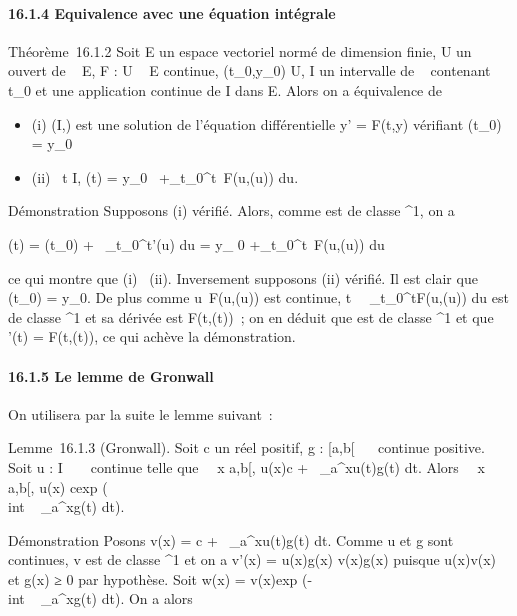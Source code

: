 \documentclass[]{article}
\begin{document}
\paragraph{16.1.4 Equivalence avec une équation intégrale}

Théorème~16.1.2 Soit E un espace vectoriel normé de dimension finie, U
un ouvert de ~ \times E, F : U \rightarrow~ E continue, (t_0,y_0) \in U,
I un intervalle de ~ contenant t_0 et \phi une application
continue de I dans E. Alors on a équivalence de

\begin{itemize}
\itemsep1pt\parskip0pt
\item
  (i) (I,\phi) est une solution de l'équation différentielle y' = F(t,y)
  vérifiant \phi(t_0) = y_0
\item
  (ii) \forall~t \in I, \phi(t) = y_0~
  +\int  _t_0^t~F(u,\phi(u))
  du.
\end{itemize}

Démonstration Supposons (i) vérifié. Alors, comme \phi est de classe
^1, on a

\phi(t) = \phi(t_0) +\int ~
_t_0^t\phi'(u) du = y_ 0
+\int  _t_0^t~F(u,\phi(u))
du

ce qui montre que (i) \rigtharrow~(ii). Inversement supposons (ii) vérifié. Il est
clair que \phi(t_0) = y_0. De plus comme
u\mapsto~F(u,\phi(u)) est continue,
t\mapsto~\int ~
_t_0^tF(u,\phi(u)) du est de classe ^1
et sa dérivée est F(t,\phi(t))~; on en déduit que \phi est de classe
^1 et que \phi'(t) = F(t,\phi(t)), ce qui achève la démonstration.

\paragraph{16.1.5 Le lemme de Gronwall}

On utilisera par la suite le lemme suivant~:

Lemme~16.1.3 (Gronwall). Soit c un réel positif, g : {[}a,b{[}\rightarrow~ ~
continue positive. Soit u : I \rightarrow~ ~ continue telle que
\forall~~x \in {[}a,b{[}, u(x)\leq c
+\int ~
_a^xu(t)g(t) dt. Alors
\forall~~x \in {[}a,b{[}, u(x)\leq
cexp (\\int ~
_a^xg(t) dt).

Démonstration Posons v(x) = c +\int ~
_a^xu(t)g(t) dt. Comme u et g sont
continues, v est de classe ^1 et on a v'(x) =
u(x)g(x) \leq v(x)g(x) puisque
u(x)\leq v(x) et g(x) ≥ 0 par hypothèse. Soit w(x) =
v(x)exp (-\\int ~
_a^xg(t) dt). On a alors
\end{document}

